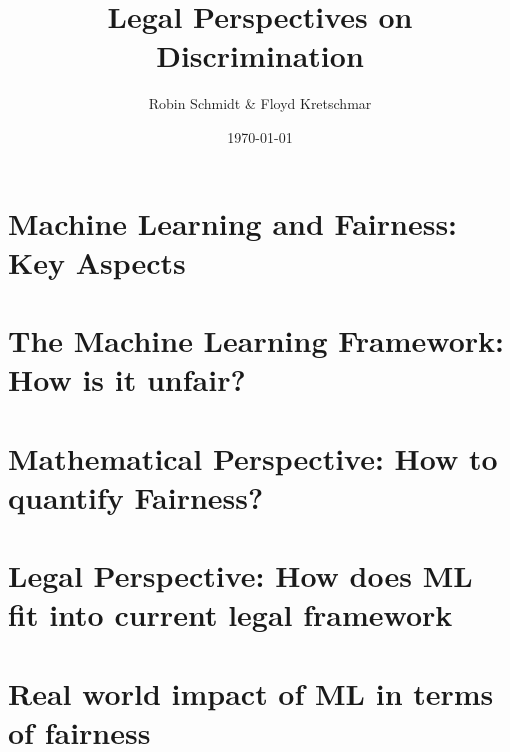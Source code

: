 \documentclass[9pt, t]{beamer}
\title{Legal Perspectives on Discrimination}
\subtitle{Robin Schmidt \& Floyd Kretschmar}
\institute{\texttt{[image: assets/uni\_logo\_dark.png]}}
\date{\today}
\begin{document}
\titlepage

\section{Machine Learning and Fairness: Key Aspects}

\section{The Machine Learning Framework: How is it unfair?}

\section{Mathematical Perspective: How to quantify Fairness?}

\section{Legal Perspective: How does ML fit into current legal framework}

\section{Real world impact of ML in terms of fairness}
\end{document}
